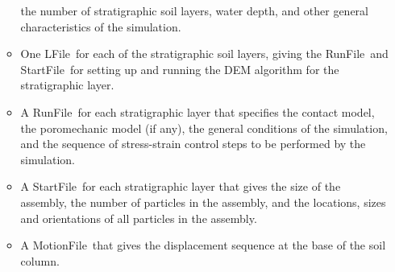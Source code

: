 \documentclass[letterpaper,11pt]{article}
\newcommand{\RunFile}{\textsf{RunFile}}
\newcommand{\StartFile}{\textsf{StartFile}}
\newcommand{\LFile}{\textsf{LFile}}
\newcommand{\MotionFile}{\textsf{MotionFile}}
\begin{document}
\begin{enumerate}
\begin{itemize}
          the number of stratigraphic soil layers,
          water depth, and
          other general characteristics of the simulation.
        \item
          One \LFile\ for each of the stratigraphic soil layers,
          giving the \RunFile\ and \StartFile\ for setting up and running
          the DEM algorithm for the stratigraphic layer.
        \item
          A \RunFile\ for each stratigraphic layer
          that specifies the contact model,
          the poromechanic model (if any),
          the general conditions of the simulation,
          and the sequence of stress-strain control steps
         to be performed by the simulation.
        \item
          A \StartFile\ for each stratigraphic layer
          that gives the size of the assembly,
          the number of particles in the assembly,
          and the locations, sizes and orientations of
          all particles in the assembly.
        \item
          A \MotionFile\ that gives the displacement sequence
          at the base of the soil column.
      \end{itemize}
\end{enumerate}
%
%
\end{document}
